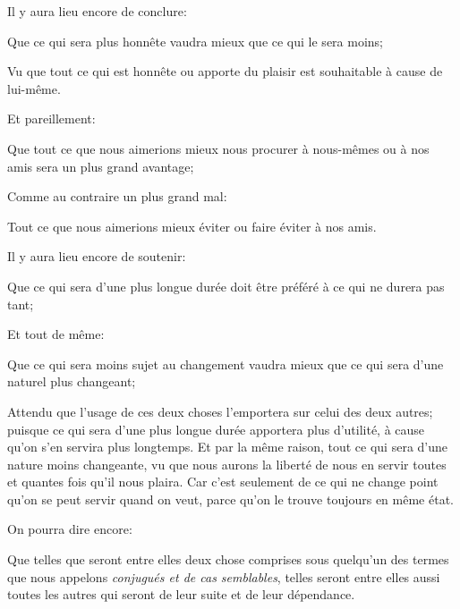 Il y aura lieu encore de conclure:

\begin{lieu}
	Que ce qui sera plus honnête vaudra mieux que ce qui le sera moins;
\end{lieu}

Vu que tout ce qui est honnête ou apporte du plaisir est souhaitable à cause de lui-même.

\bigbreak

Et pareillement:

\begin{lieu}
	Que tout ce que nous aimerions mieux nous procurer à nous-mêmes ou à nos amis sera un plus grand avantage;
\end{lieu}

Comme au contraire un plus grand mal:

\begin{lieu}
	Tout ce que nous aimerions mieux éviter ou faire éviter à nos amis.
\end{lieu}

\bigbreak

Il y aura lieu encore de soutenir:

\begin{lieu}
	Que ce qui sera d'une plus longue durée doit être préféré à ce qui ne durera pas tant;
\end{lieu}

Et tout de même:

\begin{lieu}
	Que ce qui sera moins sujet au changement vaudra mieux que ce qui sera d'une naturel plus changeant;
\end{lieu}

Attendu que l'usage de ces deux choses l'emportera sur celui des deux autres; puisque ce qui sera d'une plus
longue durée apportera plus d'utilité, à cause qu'on s'en servira plus longtemps. Et par la même raison, tout
ce qui sera d'une nature moins changeante, vu que nous aurons la liberté de nous en servir toutes et quantes
fois qu'il nous plaira. Car c'est seulement de ce qui ne change point qu'on se peut servir quand on veut, parce
qu'on le trouve toujours en même état.

\bigbreak

On pourra dire encore:

\begin{lieu}
	Que telles que seront entre elles deux chose comprises sous quelqu'un des termes que nous appelons \emph{
	conjugués et de cas semblables}, telles seront entre elles aussi toutes les autres qui seront de leur suite
	et de leur dépendance.
\end{lieu}

